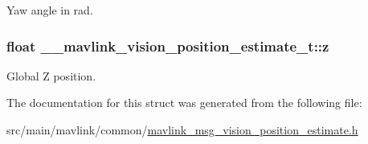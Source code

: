 Yaw angle in rad. 

\hypertarget{struct____mavlink__vision__position__estimate__t_a930c0e377720e12a1413db5799d35caf}{
\subsubsection[{z}]{\setlength{\rightskip}{0pt plus 5cm}float \+\_\+\+\_\+mavlink\+\_\+vision\+\_\+position\+\_\+estimate\+\_\+t\+::z}}\label{struct____mavlink__vision__position__estimate__t_a930c0e377720e12a1413db5799d35caf}


Global Z position. 



The documentation for this struct was generated from the following file\+:\begin{DoxyCompactItemize}
\item 
src/main/mavlink/common/\hyperlink{mavlink__msg__vision__position__estimate_8h}{mavlink\+\_\+msg\+\_\+vision\+\_\+position\+\_\+estimate.\+h}\end{DoxyCompactItemize}
